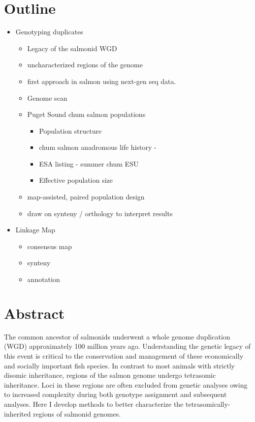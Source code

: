 \documentclass[12pt,  one column]{article}
\begin{document}
% 

\section*{Outline}
\begin{itemize}

\item Genotyping duplicates
\begin{itemize}
\item Legacy of the salmonid WGD
\item uncharacterized regions of the genome 
\item first approach in salmon using next-gen seq data.
\end{itemize}

\begin{itemize}
\item Genome scan
\item Puget Sound chum salmon populations
\begin{itemize}
\item Population structure
\item chum salmon anadromous life history - 
\item ESA listing - summer chum ESU
\item Effective population size
\end{itemize}

\item map-assisted, paired population design
\item draw on synteny / orthology to interpret results
\end{itemize}

\item Linkage Map
\begin{itemize}
\item consensus map
\item synteny
\item annotation
\end{itemize}

\end{itemize}

\pagebreak
\section*{Abstract}
The common ancestor of salmonids underwent a whole genome duplication (WGD) approximately 100 million years ago. Understanding the genetic legacy of this event is critical to the conservation and management of these economically and socially important fish species. In contrast to most animals with strictly disomic inheritance, regions of the salmon genome undergo tetrasomic inheritance.  Loci in these regions are often excluded from genetic analyses owing to increased complexity during both genotype assignment and subsequent analyses. Here I develop methods to better characterize the tetrasomically-inherited regions of salmonid genomes.
\end{document}
